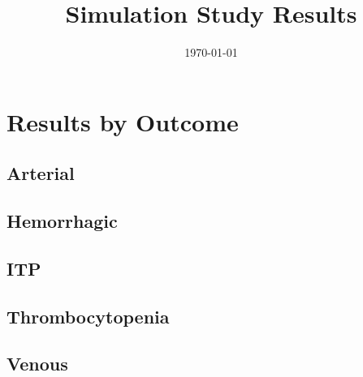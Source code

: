 \documentclass[12pt,a4paper]{article}
\title{Simulation Study Results}
\author{}
\date{\today}
\begin{document}
\maketitle

\section{Results by Outcome}
\subsection{Arterial}
\begin{landscape}

\end{landscape}

\subsection{Hemorrhagic}
\begin{landscape}

\end{landscape}

\subsection{ITP}
\begin{landscape}

\end{landscape}

\subsection{Thrombocytopenia}
\begin{landscape}

\end{landscape}

\subsection{Venous}
\begin{landscape}

\end{landscape}
\end{document}
